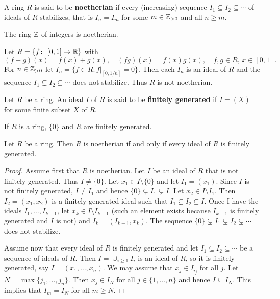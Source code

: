 \chapter{}


\begin{definition}
	A ring $R$ is said to be \textbf{noetherian} if every (increasing)
	sequence $I_1\subseteq I_2\subseteq\cdots$ of ideals of $R$
	stabilizes, that is $I_n=I_m$ for some $m\in\mathbb{Z}_{>0}$ and all $n\geq m$. 
\end{definition}

The ring $\mathbb{Z}$ of integers is noetherian.

\begin{exercise}
Let $R=\{f\colon [0,1]\to\R\}$ with 
\[
(f+g)(x)=f(x)+g(x),
\quad
(fg)(x)=f(x)g(x),
\quad
f,g\in R,\,x\in [0,1].
\]
For $n\in\mathbb{Z}_{>0}$ let
$I_n=\{f\in R:f|_{[0,1/n]}=0\}$. Then each $I_n$ is an ideal of $R$ and 
the sequence 
$I_1\subsetneq I_2\subsetneq\cdots$ 
does not stabilize. Thus $R$ is not noetherian. 
\end{exercise}

\begin{definition}
	Let $R$ be a ring. An ideal $I$ of $R$ 
	is said to be \textbf{finitely generated} if $I=(X)$ for some
	finite subset $X$ of $R$. 
\end{definition}

If $R$ is a ring, $\{0\}$ and $R$ are finitely generated. 

\begin{proposition}
Let $R$ be a ring. Then $R$ is noetherian if and only 
if every ideal of $R$ is finitely generated. 	
\end{proposition}

\begin{proof}
	Assume first that $R$ is noetherian. Let $I$ be an ideal of $R$ that is not finitely generated. 
	Thus $I\ne\{0\}$. Let $x_1\in I\setminus\{0\}$ and let $I_1=(x_1)$. Since $I$ is not finitely
	generated, $I\ne I_1$ and hence   
	$\{0\}\subsetneq I_1\subsetneq I$. Let $x_2\in I\setminus I_1$. Then
	$I_2=(x_1,x_2)$ is a finitely generated ideal such that 
	$I_1\subsetneq I_2\subsetneq I$.	 Once I have the ideals $I_1,\dots,I_{k-1}$, let 
	$x_k\in I\setminus I_{k-1}$ (such an element exists because $I_{k-1}$ is finitely generated
	and $I$ is not) and $I_k=(I_{k-1},x_k)$. The sequence
	$\{0\}\subsetneq I_1\subsetneq I_2\subsetneq\cdots$ does not stabilize.  
	
	Assume now that every ideal of $R$ is finitely generated and 
	let $I_1\subseteq I_2\subseteq\cdots$ be a sequence of ideals of $R$. Then
	$I=\cup_{i\geq1}I_i$ is an ideal of $R$, so it is finitely generated, say
	$I=(x_1,\dots,x_n)$. We may assume that $x_j\in I_{i_j}$ for all $j$. Let 
	$N=\max\{j_1,\dots,j_n\}$. Then 
	$x_j\in I_N$ for all $j\in\{1,\dots,n\}$ 
	and hence $I\subseteq I_N$. This implies that 
	$I_m=I_N$ for all $m\geq N$. 
\end{proof}


